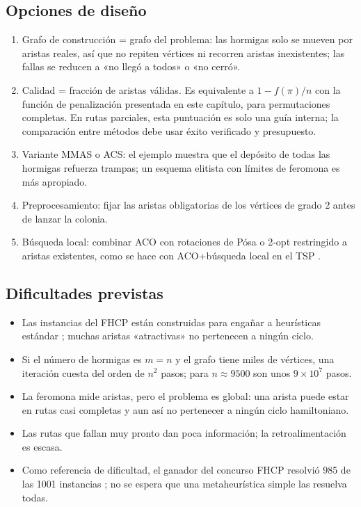 \subsection{Opciones de diseño}
\begin{enumerate}
  \item \prop{} Grafo de construcción = grafo del problema: las hormigas solo se
        mueven por aristas reales, así que no repiten vértices ni recorren aristas inexistentes; las fallas se
        reducen a «no llegó a todos» o «no cerró».
  \item \prop{} Calidad = fracción de aristas válidas. Es equivalente a
        $1-f(\pi)/n$ con la función de penalización presentada en este capítulo, para permutaciones completas. En rutas parciales, esta puntuación es solo una guía interna; la comparación entre métodos debe usar éxito verificado y presupuesto.
  \item \prop{} Variante MMAS o ACS: el ejemplo muestra que el depósito de todas las
        hormigas refuerza trampas; un esquema elitista con límites de feromona es más
        apropiado.
  \item \prop{} Preprocesamiento: fijar las aristas obligatorias de los vértices de
        grado 2 antes de lanzar la colonia.
  \item \prop{} Búsqueda local: combinar ACO con rotaciones de Pósa o 2-opt
        restringido a aristas existentes, como se hace con ACO+búsqueda local en el TSP \cite{aco3}.
\end{enumerate}

\subsection{Dificultades previstas}
\begin{itemize}[nosep]
  \item Las instancias del FHCP están construidas para engañar a heurísticas estándar \cite{aco8};
        muchas aristas «atractivas» no pertenecen a ningún ciclo.
  \item Si el número de hormigas es $m=n$ y el grafo tiene miles de vértices, una iteración
        cuesta del orden de $n^2$ pasos; para $n\approx9500$ son unos $9\times10^7$ pasos.
  \item La feromona mide aristas, pero el problema es global: una arista puede estar en
        rutas casi completas y aun así no pertenecer a ningún ciclo hamiltoniano.
  \item Las rutas que fallan muy pronto dan poca información; la retroalimentación es escasa.
  \item Como referencia de dificultad, el ganador del concurso FHCP resolvió 985 de las
        1001 instancias \cite{aco9}; no se espera que una metaheurística simple las resuelva todas.
\end{itemize}

